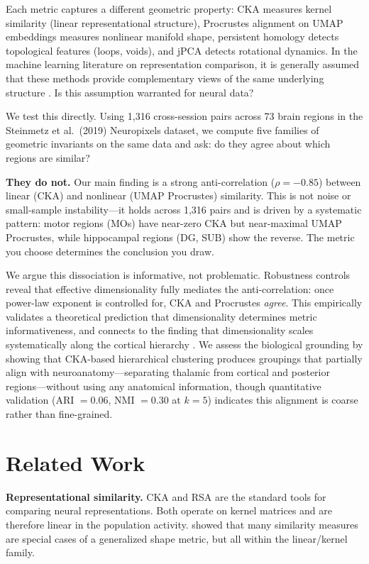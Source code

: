 \documentclass{article}
\begin{document}
Each metric captures a different geometric property: CKA measures kernel similarity (linear representational structure), Procrustes alignment on UMAP embeddings measures nonlinear manifold shape, persistent homology detects topological features (loops, voids), and jPCA detects rotational dynamics. In the machine learning literature on representation comparison, it is generally assumed that these methods provide complementary views of the same underlying structure \citep{klabunde2023similarity}. Is this assumption warranted for neural data?

We test this directly. Using 1,316 cross-session pairs across 73 brain regions in the Steinmetz et al.\ (2019) Neuropixels dataset, we compute five families of geometric invariants on the same data and ask: do they agree about which regions are similar?

\textbf{They do not.} Our main finding is a strong anti-correlation ($\rho = -0.85$) between linear (CKA) and nonlinear (UMAP Procrustes) similarity. This is not noise or small-sample instability—it holds across 1,316 pairs and is driven by a systematic pattern: motor regions (MOs) have near-zero CKA but near-maximal UMAP Procrustes, while hippocampal regions (DG, SUB) show the reverse. The metric you choose determines the conclusion you draw.

We argue this dissociation is informative, not problematic. Robustness controls reveal that effective dimensionality fully mediates the anti-correlation: once power-law exponent is controlled for, CKA and Procrustes \emph{agree}. This empirically validates a theoretical prediction \citep{harvey2024representational} that dimensionality determines metric informativeness, and connects to the finding that dimensionality scales systematically along the cortical hierarchy \citep{huntenburg2024categorical, stringer2024unbounded}. We assess the biological grounding by showing that CKA-based hierarchical clustering produces groupings that partially align with neuroanatomy---separating thalamic from cortical and posterior regions---without using any anatomical information, though quantitative validation (ARI $= 0.06$, NMI $= 0.30$ at $k = 5$) indicates this alignment is coarse rather than fine-grained.

\section{Related Work}

\textbf{Representational similarity.} CKA \citep{kornblith2019similarity} and RSA \citep{kriegeskorte2008representational} are the standard tools for comparing neural representations. Both operate on kernel matrices and are therefore linear in the population activity. \citet{williams2021generalized} showed that many similarity measures are special cases of a generalized shape metric, but all within the linear/kernel family.
\end{document}
